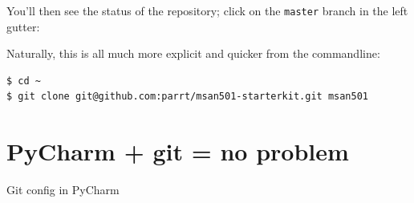 You'll then see the status of the repository; click on the {\tt master} branch in the left gutter:
\vspace{5mm}


Naturally, this is all much more explicit and quicker from the commandline:

\begin{lstlisting}[style=BashInputStyle]
$ cd ~
$ git clone git@github.com:parrt/msan501-starterkit.git msan501
\end{lstlisting}

\section{PyCharm + git = no problem}

\begin{marginfigure}[1in]
\begin{center}
\end{center}
\caption{Git config in PyCharm}
\end{marginfigure}

